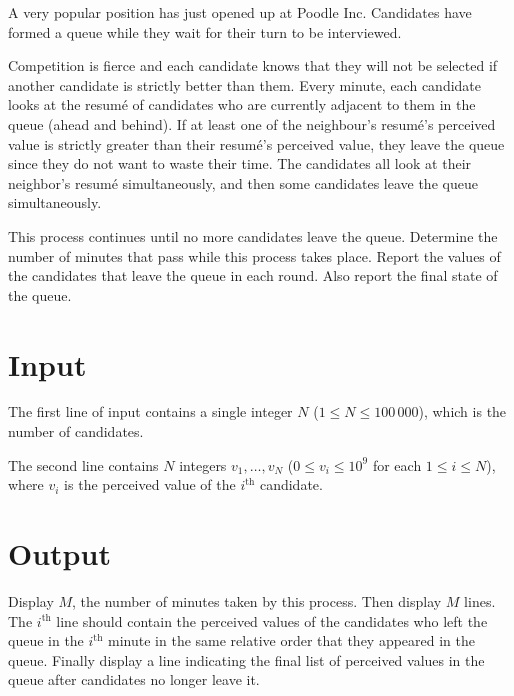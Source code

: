 
A very popular position has just opened up at Poodle Inc. Candidates have formed
a queue while they wait for their turn to be interviewed.

Competition is fierce and each candidate knows that they will not be selected if another candidate is strictly better than them. Every minute, each candidate looks at the resum\'{e} of candidates who are currently adjacent to them in the queue (ahead and behind). If at least one of the neighbour's resum\'{e}'s perceived value is strictly greater than their resum\'{e}'s perceived value, they leave the queue since they do not want to waste their time. The candidates all look at their neighbor's resum\'{e} simultaneously, and then some candidates leave the queue simultaneously.

This process continues until no more candidates leave the queue. Determine the number of minutes that pass while this process takes place. Report the values of the candidates that leave the queue in each round. Also report the final state of the queue.

\section*{Input}

The first line of input contains a single integer $N$ ($1 \leq N \leq 100\,000$), which is the number of candidates.

The second line contains $N$ integers $v_1, \ldots, v_N$ ($0 \leq v_i \leq 10^9$ for each $1 \leq i \leq N$), where $v_i$ is the perceived value of the $i^\textrm{th}$ candidate.

\section*{Output}
Display $M$, the number of minutes taken by this process. Then display $M$ lines. The $i^\textrm{th}$ line should contain the perceived values of the candidates who left the queue in the $i^\textrm{th}$ minute in the same relative order that they appeared in the queue. Finally display a line indicating the final list of perceived values in the queue after candidates no longer leave it.
